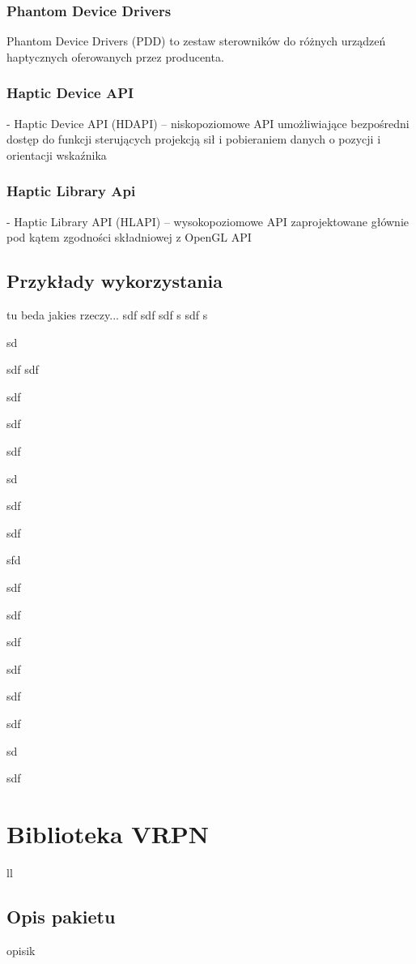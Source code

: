 \documentclass[licencjacka]{pracamgr}
\begin{document}
\subsection{Phantom Device Drivers}
Phantom Device Drivers (PDD) to zestaw sterowników do różnych urządzeń haptycznych oferowanych przez producenta.



\subsection{Haptic Device API}
- Haptic Device API (HDAPI) – niskopoziomowe API umożliwiające bezpośredni dostęp do funkcji sterujących projekcją sił i pobieraniem danych o pozycji i orientacji wskaźnika


\subsection{Haptic Library Api}
- Haptic Library API (HLAPI) – wysokopoziomowe API zaprojektowane głównie pod kątem zgodności składniowej z OpenGL API



\section{Przykłady wykorzystania}
tu beda jakies rzeczy...
sdf
sdf
sdf
s
sdf
s

sd

sdf
sdf


sdf

sdf

sdf

sd

sdf

sdf

sfd

sdf

sdf

sdf

sdf

sdf

sdf

sd

sdf




\chapter{Biblioteka VRPN}
ll

\section{Opis pakietu}
opisik
\end{document}
